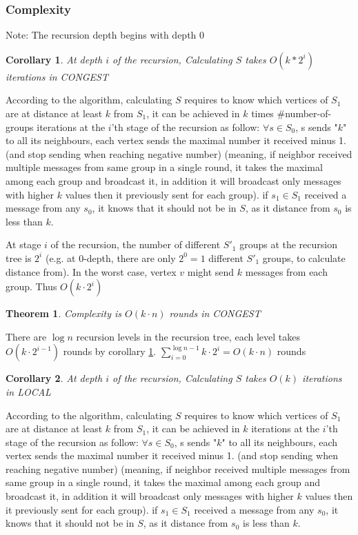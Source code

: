 \documentclass[11pt]{article}
\newtheorem{theorem}{Theorem}[section]
\newtheorem{corollary}{Corollary}[theorem]
\begin{document}
\subsubsection*{Complexity}
Note: The recursion depth begins with depth 0

\begin{corollary}
At depth $i$ of the recursion, Calculating $S$ takes $O(k* 2^{i})$  iterations in CONGEST
\label{calculating_S_1_iteration_i}
\end{corollary}

According to the algorithm, calculating $S$ requires to know which vertices of $S_1$ are at distance at least $k$ from $S_1$, it can be achieved in $k$ times \#number-of-groups iterations at the $i$'th stage of the recursion as follow:
$\forall s \in S_0$, s sends  "$k$" to all its neighbours, each vertex sends the maximal number it received minus 1. (and stop sending when reaching negative number) (meaning, if neighbor received multiple messages from same group in a single round, it takes the maximal among each group and broadcast it, in addition it will broadcast only messages with higher $k$ values then it previously sent for each group). if $s_1 \in S_1$ received a message from any $s_0$, it knows that it should not be in $S$, as it distance from $s_0$ is less than $k$.

At stage $i$ of the recursion, the number of different $S'_1$ groups at the recursion tree is $2^{i}$ (e.g. at 0-depth, there are only $2^{0}=1$ different $S'_1$ groups, to calculate distance from). In the worst case, vertex $v$ might send $k$ messages from each group. Thus $O(k \cdot 2^{i})$ 


\begin{theorem}
\label{Complexity_2_1}
Complexity is $O(k \cdot n)$ rounds in CONGEST
\end{theorem}
There are $\log{n}$ recursion levels in the recursion tree, each level takes
$O(k \cdot 2^{i-1})$ rounds by corollary \ref{calculating_S_1_iteration_i}.
$\sum_{i=0}^{\log{n}-1} k \cdot 2^{i} = O(k \cdot n)$ rounds

\begin{corollary}
At depth $i$ of the recursion, Calculating $S$ takes $O(k)$  iterations in LOCAL
\label{calculating_S_1_iteration_i_LOCAL}
\end{corollary}
According to the algorithm, calculating $S$ requires to know which vertices of $S_1$ are at distance at least $k$ from $S_1$, it can be achieved in $k$ iterations at the $i$'th stage of the recursion as follow:
$\forall s \in S_0$, s sends  "$k$" to all its neighbours, each vertex sends the maximal number it received minus 1. (and stop sending when reaching negative number) (meaning, if neighbor received multiple messages from same group in a single round, it takes the maximal among each group and broadcast it, in addition it will broadcast only messages with higher $k$ values then it previously sent for each group). if $s_1 \in S_1$ received a message from any $s_0$, it knows that it should not be in $S$, as it distance from $s_0$ is less than $k$.
\end{document}
